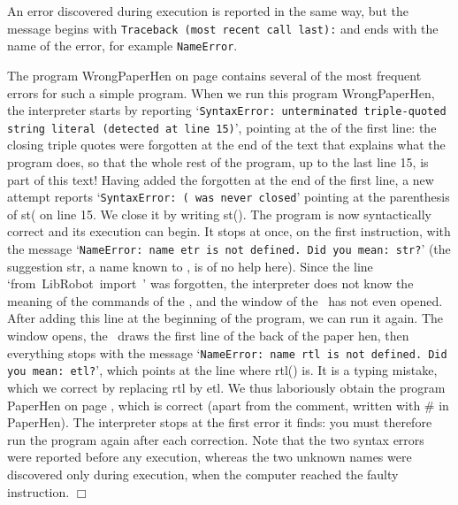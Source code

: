 An error discovered during execution is reported in the same way, but the
message begins with {\tt Traceback (most recent call last):}
and ends with the name of the error, for example {\tt NameError}.

\begin{exemple}{\rm
\hfill The pro\-gram {\idt WrongPaperHen} on page
\pageref{prog:Cocotte-errone}
contains several of the most frequent errors for
such a simple program.
When we run this program {\idt WrongPaperHen}, the interpreter starts by reporting
`{\tt SyntaxError: unterminated triple-quoted string literal (detected at line 15)}',
pointing at
the {\cha {}} of the
first line: the closing triple quotes were forgotten at the end of the
text that explains what the program does, so that the whole rest of the
program, up to the last line 15, is part of this text!
Having added the forgotten {\cha {}} at the end of the first line,
a new attempt reports
`{\tt SyntaxError: \textquotesingle{}(\textquotesingle{} was never closed}'
pointing at the parenthesis of {\idt st(} on line 15. We close it by writing {\idt st()}.
The program is now syntactically correct and its execution can begin.
It stops at once, on the first instruction, with the message
`{\tt NameError: name \textquotesingle{}etr\textquotesingle{} is not defined. Did you mean: \textquotesingle{}str\textquotesingle{}?}'
(the suggestion {\idt str}, a name known to \python, is of no help here).
Since the line `{\mcl from}\ {\idt LibRobot}\ {\mcl import}\ {\idt *}' was forgotten,
the interpreter does not know the meaning of the commands of the \robotErr, and the window
of the \robot\ has not even opened.
After adding this line at the beginning of the program, we can run it again.
The window opens, the \robot\ draws the first line of the back of the paper hen,
then everything stops with the message
`{\tt NameError: name \textquotesingle{}rtl\textquotesingle{} is not defined. Did you mean: \textquotesingle{}etl\textquotesingle{}?}',
which points at the
line where {\idt rtl()} is. It is a typing
mistake, which we correct by replacing {\idt  rtl} by {\idt  etl}.
We thus laboriously obtain the program {\idt PaperHen} on page
\pageref{prog:Cocotte}, which is correct (apart from the comment, written with {\cmt \#} in {\idt PaperHen}).
The interpreter stops at the first error it finds: you must therefore
run the program again after each correction. Note that the two syntax
errors were reported before any execution, whereas the two unknown names
were discovered only during execution, when the com\-pu\-ter reached
the faulty instruction.
\noindent $\Box$ }\end{exemple}


